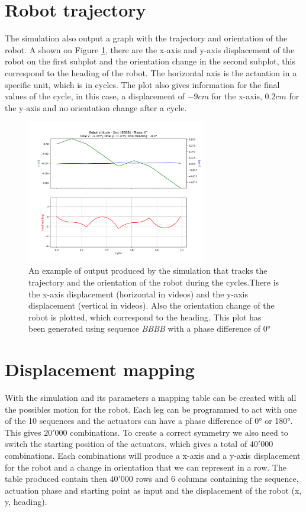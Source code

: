     \section{Robot trajectory}\label{sec:res_position}
        The simulation also output a graph with the trajectory and orientation of the robot. A shown on Figure \ref{fig:robot_position}, there are the x-axis and y-axis displacement of the robot on the first subplot and the orientation change in the second subplot, this correspond to the heading of the robot. The horizontal axis is the actuation in a specific unit, which is in cycles. The plot also gives information for the final values of the cycle, in this case, a displacement of $-9cm$ for the x-axis, $0.2cm$ for the y-axis and no orientation change after a cycle.
        \begin{figure}[h]
            \centering
            \includegraphics[width=0.7\textwidth]{images/robot_position.png}
            \caption{An example of output produced by the simulation that tracks the trajectory and the orientation of the robot during the cycles.There is the x-axis displacement (horizontal in videos) and the y-axis displacement (vertical in videos). Also the orientation change of the robot is plotted, which correspond to the heading. This plot has been generated using sequence \textit{BBBB} with a phase difference of $0$°}
            \label{fig:robot_position}
        \end{figure}
    
    \section{Displacement mapping}\label{sec:res_mapping}
        With the simulation and its parameters a mapping table can be created with all the possibles motion for the robot. Each leg can be programmed to act with one of the 10 sequences and the actuators can have a phase difference of 0° or 180°. This gives $20'000$ combinations. To create a correct symmetry we also need to switch the starting position of the actuators, which gives a total of $40'000$ combinations. Each combinations will produce a x-axis and a y-axis displacement for the robot and a change in orientation that we can represent in a row. The table produced contain then $40'000$ rows and $6$ columns containing the sequence, actuation phase and starting point as input and the displacement of the robot (x, y, heading).\\
        

